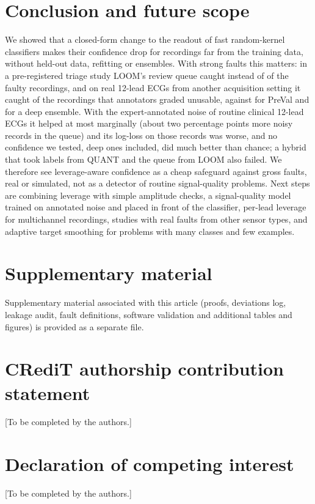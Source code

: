 \documentclass[preprint,12pt,authoryear]{elsarticle}
\begin{document}
\section{Conclusion and future scope}\label{sec:conclusion}
We showed that a closed-form change to the readout of fast random-kernel classifiers makes their confidence drop for recordings far from the training data, without held-out data, refitting or ensembles. With strong faults this matters: in a pre-registered triage study LOOM's review queue caught \CCaughtLoom{} instead of \CCaughtPreVal{} of the faulty recordings, and on real 12-lead ECGs from another acquisition setting it caught \CincHTwelveCaughtLoom{} of the recordings that annotators graded unusable, against \CincHTwelveCaughtPreVal{} for PreVal and \CincCaughtDeepEns{} for a deep ensemble. With the expert-annotated noise of routine clinical 12-lead ECGs it helped at most marginally (about two percentage points more noisy records in the queue) and its log-loss on those records was worse, and no confidence we tested, deep ones included, did much better than chance; a hybrid that took labels from QUANT and the queue from LOOM also failed. We therefore see leverage-aware confidence as a cheap safeguard against gross faults, real or simulated, not as a detector of routine signal-quality problems. Next steps are combining leverage with simple amplitude checks, a signal-quality model trained on annotated noise and placed in front of the classifier, per-lead leverage for multichannel recordings, studies with real faults from other sensor types, and adaptive target smoothing for problems with many classes and few examples.

\section*{Supplementary material}
Supplementary material associated with this article (proofs, deviations log, leakage audit, fault definitions, software validation and additional tables and figures) is provided as a separate file.

\section*{CRediT authorship contribution statement}
[To be completed by the authors.]

\section*{Declaration of competing interest}
[To be completed by the authors.]
\end{document}
